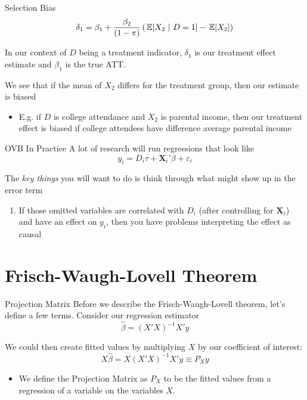 \documentclass[aspectratio=169,t,11pt,table]{beamer}
\begin{document}
\begin{frame}{Selection Bias}
  \vspace*{-\bigskipamount}
  $$
    \delta_1 = \beta_1 + \frac{\beta_2}{(1 - \pi)} \left( \expec{X_2}{D = 1} - \expec{X_2} \right)
  $$

  \bigskip
  In our context of $D$ being a treatment indicator, $\delta_1$ is our treatment effect estimate and $\beta_1$ is the true ATT.

  \pause
  \bigskip
  We see that if the mean of $X_2$ differs for the treatment group, then our estimate is biased
  \begin{itemize}
    \item E.g. if $D$ is college attendance and $X_2$ is parental income, then our treatment effect is biased if college attendees have difference average parental income
  \end{itemize}
\end{frame}


\begin{frame}{OVB In Practice}
  A lot of research will run regressions that look like 
  $$
    y_i = D_i \tau + \bm{X}_i' \beta + \varepsilon_i
  $$

  \bigskip
  The \emph{key things} you will want to do is think through what might show up in the error term
  \begin{enumerate}
    \item If those omitted variables are correlated with $D_i$ (after controlling for $\bm{X}_i$) and have an effect on $y_i$, then you have problems interpreting the effect as causal
  \end{enumerate}
\end{frame}


\section{Frisch-Waugh-Lovell Theorem}

\begin{frame}{Projection Matrix}
  Before we describe the Frisch-Waugh-Lovell theorem, let's define a few terms. Consider our regression estimator
  $$
    \hat{\beta} = \left( X'X \right)^{-1} X' y
  $$
  
  \bigskip
  We could then create fitted values by multiplying $X$ by our coefficient of interest: 
  $$
    X \hat{\beta} = X \left( X'X \right)^{-1} X' y \equiv P_X y
  $$
  \begin{itemize}
    \item We define the \alert{Projection Matrix} as $P_X$ to be the fitted values from a regression of a variable on the variables $X$.
  \end{itemize}
\end{frame}
\end{document}
